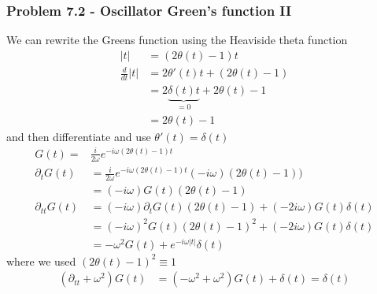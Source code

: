 \documentclass[10pt,a4paper]{article}
\theoremstyle{definition}
\begin{document}
\subsubsection{Problem 7.2 - Oscillator Green's function II}
We can rewrite the Greens function using the Heaviside theta function 
\begin{align}
|t|
&=(2\theta(t)-1)t\\
\frac{d}{dt}|t|
&=2\theta'(t)t+(2\theta(t)-1)\\
&=2\underbrace{\delta(t)t}_{=0}+2\theta(t)-1\\
&=2\theta(t)-1
\end{align}
and then differentiate and use $\theta'(t)=\delta(t)$
\begin{align}
G(t)=&\frac{i}{2\omega}e^{-i\omega(2\theta(t)-1)t}\\
\partial_t G(t)
&=\frac{i}{2\omega}e^{-i\omega(2\theta(t)-1)t}(-i\omega)(2\theta(t)-1))\\
&=(-i\omega)G(t)\left(2\theta(t)-1\right)\\
\partial_{tt} G(t)
&=(-i\omega)\partial_tG(t)\left(2\theta(t)-1\right)+(-2i\omega)G(t)\delta(t)\\
&=(-i\omega)^2G(t)\left(2\theta(t)-1\right)^2+(-2i\omega)G(t)\delta(t)\\
&=-\omega^2G(t)+e^{-i\omega|t|}\delta(t)
\end{align}
where we used $\left(2\theta(t)-1\right)^2\equiv1$
\begin{align}
\left(\partial_{tt}+\omega^2\right)G(t)
&=\left(-\omega^2+\omega^2\right)G(t)+\delta(t)=\delta(t)
\end{align}
\end{document}
